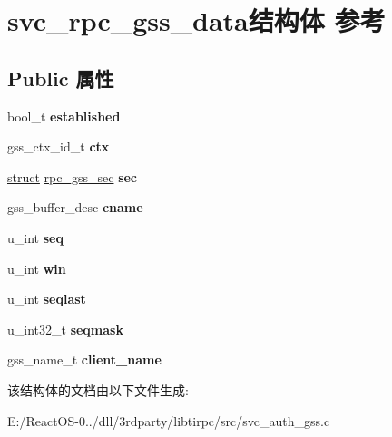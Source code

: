 \hypertarget{structsvc__rpc__gss__data}{}\section{svc\+\_\+rpc\+\_\+gss\+\_\+data结构体 参考}
\label{structsvc__rpc__gss__data}
\subsection*{Public 属性}
\begin{DoxyCompactItemize}
\item 
\mbox{\label{structsvc__rpc__gss__data_a46e3ef1d6d4cc83a20527bff90601c3c}} 
bool\+\_\+t {\bfseries established}
\item 
\mbox{\label{structsvc__rpc__gss__data_a7d8d23aa0efabe3e825601cb0d9463a3}} 
gss\+\_\+ctx\+\_\+id\+\_\+t {\bfseries ctx}
\item 
\mbox{\label{structsvc__rpc__gss__data_ae67dce2bd2477165741fcb10ad1d6dc0}} 
\hyperlink{interfacestruct}{struct} \hyperlink{structrpc__gss__sec}{rpc\+\_\+gss\+\_\+sec} {\bfseries sec}
\item 
\mbox{\label{structsvc__rpc__gss__data_a485568de1dafd294783a76bd695e3974}} 
gss\+\_\+buffer\+\_\+desc {\bfseries cname}
\item 
\mbox{\label{structsvc__rpc__gss__data_a3843152218e0d28ec0c4ffafd648b2c1}} 
u\+\_\+int {\bfseries seq}
\item 
\mbox{\label{structsvc__rpc__gss__data_aa35a4f53b976a4f08d3af0526ea5de3f}} 
u\+\_\+int {\bfseries win}
\item 
\mbox{\label{structsvc__rpc__gss__data_a8fb9a5dce41a2b5e3176338a8edd0497}} 
u\+\_\+int {\bfseries seqlast}
\item 
\mbox{\label{structsvc__rpc__gss__data_a9697281a931fb314d02485fa17e4c164}} 
u\+\_\+int32\+\_\+t {\bfseries seqmask}
\item 
\mbox{\label{structsvc__rpc__gss__data_a8681c125d2d142fb1c5f7c93e5f472ca}} 
gss\+\_\+name\+\_\+t {\bfseries client\+\_\+name}
\end{DoxyCompactItemize}


该结构体的文档由以下文件生成\+:\begin{DoxyCompactItemize}
\item 
E\+:/\+React\+O\+S-\/0../dll/3rdparty/libtirpc/src/svc\+\_\+auth\+\_\+gss.\+c\end{DoxyCompactItemize}

